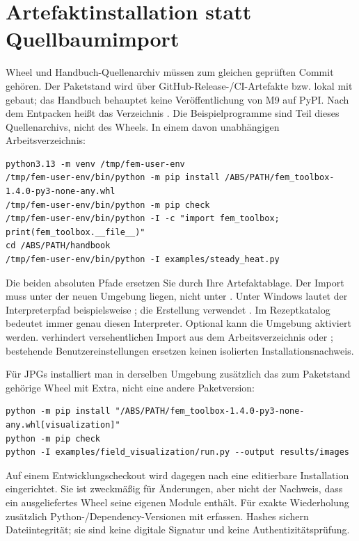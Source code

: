 \section{Artefaktinstallation statt Quellbaumimport}
Wheel und Handbuch-Quellenarchiv müssen zum gleichen geprüften Commit gehören.
Der Paketstand wird über GitHub-Release-/CI-Artefakte bzw. lokal mit
 gebaut; das Handbuch behauptet keine Veröffentlichung
von M9 auf PyPI. Nach dem Entpacken heißt das Verzeichnis .
Die Beispielprogramme sind Teil dieses Quellenarchivs, nicht des Wheels.
In einem davon unabhängigen Arbeitsverzeichnis:
\begin{lstlisting}
python3.13 -m venv /tmp/fem-user-env
/tmp/fem-user-env/bin/python -m pip install /ABS/PATH/fem_toolbox-1.4.0-py3-none-any.whl
/tmp/fem-user-env/bin/python -m pip check
/tmp/fem-user-env/bin/python -I -c "import fem_toolbox; print(fem_toolbox.__file__)"
cd /ABS/PATH/handbook
/tmp/fem-user-env/bin/python -I examples/steady_heat.py
\end{lstlisting}
Die beiden absoluten Pfade ersetzen Sie durch Ihre Artefaktablage. Der
Import muss unter  der neuen Umgebung liegen, nicht unter
. Unter Windows lautet der Interpreterpfad beispielsweise
; die Erstellung verwendet
. Im Rezeptkatalog bedeutet
 immer genau diesen Interpreter. Optional kann die Umgebung
aktiviert werden.  verhindert versehentlichen Import aus dem
Arbeitsverzeichnis oder ; bestehende Benutzereinstellungen
ersetzen keinen isolierten Installationsnachweis.

Für JPGs installiert man in derselben Umgebung zusätzlich das zum Paketstand
gehörige Wheel mit Extra, nicht eine andere Paketversion:
\begin{lstlisting}
python -m pip install "/ABS/PATH/fem_toolbox-1.4.0-py3-none-any.whl[visualization]"
python -m pip check
python -I examples/field_visualization/run.py --output results/images
\end{lstlisting}
Auf einem Entwicklungscheckout wird dagegen nach  eine
editierbare Installation eingerichtet. Sie ist zweckmäßig für Änderungen,
aber nicht der Nachweis, dass ein ausgeliefertes Wheel seine eigenen Module
enthält. Für exakte Wiederholung zusätzlich Python-/Dependency-Versionen mit
 erfassen. Hashes sichern Dateiintegrität; sie sind
keine digitale Signatur und keine Authentizitätsprüfung.

